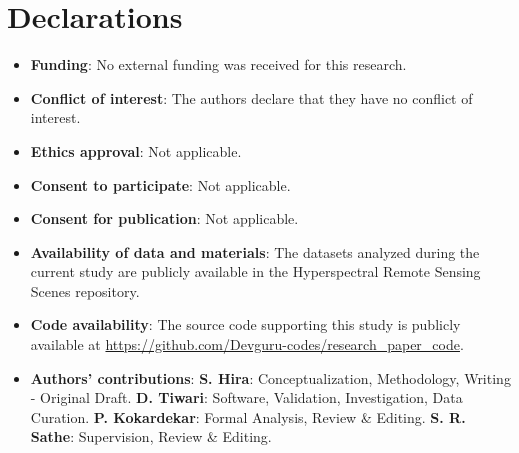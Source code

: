 \documentclass[pdflatex,sn-mathphys-num]{sn-jnl}
\theoremstyle{thmstyleone}
\theoremstyle{thmstyletwo}
\theoremstyle{thmstylethree}
\begin{document}
\section*{Declarations}
\begin{itemize}
\item \textbf{Funding}: No external funding was received for this research.
\item \textbf{Conflict of interest}: The authors declare that they have no conflict of interest.
\item \textbf{Ethics approval}: Not applicable.
\item \textbf{Consent to participate}: Not applicable.
\item \textbf{Consent for publication}: Not applicable.
\item \textbf{Availability of data and materials}: The datasets analyzed during the current study are publicly available in the Hyperspectral Remote Sensing Scenes repository.
\item \textbf{Code availability}: The source code supporting this study is publicly available at \url{https://github.com/Devguru-codes/research_paper_code}.
\item \textbf{Authors' contributions}: 
\textbf{S. Hira}: Conceptualization, Methodology, Writing - Original Draft. 
\textbf{D. Tiwari}: Software, Validation, Investigation, Data Curation.
\textbf{P. Kokardekar}: Formal Analysis, Review \& Editing.
\textbf{S. R. Sathe}: Supervision, Review \& Editing.
\end{itemize}

\nocite{zhang2025stmnet,li2025ictnet,wang2025mslkacnn,zeng2025hyperspectral,chen2025adaptive,wu2025efficient,zhou2025hyperspectral,zhang2025spatial,sun2025advances,hughes1968mean,melgani2004classification,hu2015deep,makantasis2015deep,li2017spectral,roy2020hybridsn,hu2018squeeze,woo2018cbam,wang2020eca,perez2018film,hong2022spectralformer,sun2022ssftt,li2023hyformer,daubechies1992ten,dabov2007image,baumgardner2015indian,gamba2004pavia,gic2020hyperspectral,zhong2020whu,loshchilov2019decoupled,srivastava2014dropout,paszke2019pytorch,vandermaaten2008visualizing}

\end{document}
